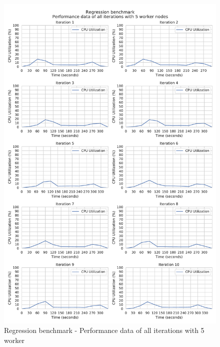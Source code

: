 \begin{figure}[h]
\centering
\includegraphics[scale=0.5]{images/appendix/evaluation_data/regression_benchmark/regression_5_worker_cpu_performance}
\caption{Regression benchmark - Performance data of all iterations with 5 worker}
\label{fig:appendix_eval_regression_static5}
\end{figure}

